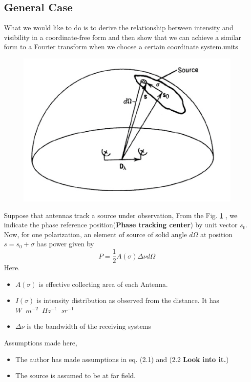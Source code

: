 \documentclass[10pt]{report}
\begin{document}
\subsection{General Case}
What we would like to do is to derive the relationship between intensity and visibility in a coordinate-free form and then show that we can achieve a similar form to a Fourier transform when we choose a certain coordinate system.units
\begin{figure}[h!]
\includegraphics[width=\linewidth]{phasetrack.png}
\label{phasetrack}
\end{figure}
Suppose that antennas track a source under observation,
From the Fig. \ref{phasetrack} , we indicate the phase reference position(\textbf{Phase tracking center}) by unit vector $s_0$.\\
Now, for one polarization, an element of source of solid angle $d\Omega$ at position $s=s_0+\sigma$ has power given by
\begin{equation}
P=\frac{1}{2}A(\sigma)\Delta\nu d\Omega
\end{equation}
Here.
\begin{itemize}
\item $A(\sigma)$ is effective collecting area of each Antenna.
\item $I(\sigma)$ is intensity distribution as observed from the distance. It has  $W \; \; m^{-2}\;\; Hz^{-1} \; \; sr^{-1}$
\item $\Delta \nu$ is the bandwidth of the receiving systems
\end{itemize}
Assumptions made here,
\begin{itemize}
\item The author has made assumptions in eq. (2.1) and (2.2 \textbf{Look into it.})
\item The source is assumed to be at far field.
\end{itemize}
\end{document}
